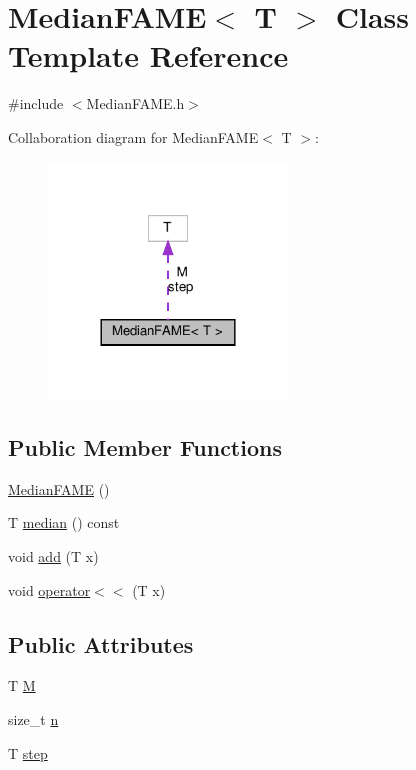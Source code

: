 \hypertarget{class_median_f_a_m_e}{}\section{Median\+F\+A\+ME$<$ T $>$ Class Template Reference}
\label{class_median_f_a_m_e}


{\ttfamily \#include $<$Median\+F\+A\+M\+E.\+h$>$}



Collaboration diagram for Median\+F\+A\+ME$<$ T $>$\+:
\nopagebreak
\begin{figure}[H]
\begin{center}
\leavevmode
\includegraphics[width=180pt]{class_median_f_a_m_e__coll__graph}
\end{center}
\end{figure}
\subsection*{Public Member Functions}
\begin{DoxyCompactItemize}
\item 
\hyperlink{class_median_f_a_m_e_a5f7fa4a3764af4fbf6586479b3c2af46}{Median\+F\+A\+ME} ()
\item 
T \hyperlink{class_median_f_a_m_e_a3649461af2073421813b132f9f6e740b}{median} () const
\item 
void \hyperlink{class_median_f_a_m_e_aaf2310a3e21e455605c0f9d3375a7e5c}{add} (T x)
\item 
void \hyperlink{class_median_f_a_m_e_a95e83a1782a9fd3b79610a2c58a58dfe}{operator$<$$<$} (T x)
\end{DoxyCompactItemize}
\subsection*{Public Attributes}
\begin{DoxyCompactItemize}
\item 
T \hyperlink{class_median_f_a_m_e_a30154005cf17855ab19266f568803174}{M}
\item 
size\+\_\+t \hyperlink{class_median_f_a_m_e_a0318b43dd3ae39b735a152c16ae4baec}{n}
\item 
T \hyperlink{class_median_f_a_m_e_a99c7b975965259ed4079c08836583732}{step}
\end{DoxyCompactItemize}


